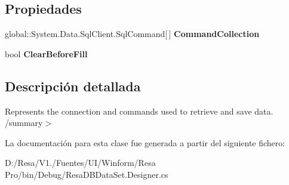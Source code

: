 \subsection*{Propiedades}
\begin{DoxyCompactItemize}
\item 
global\+::\+System.\+Data.\+Sql\+Client.\+Sql\+Command[$\,$] {\bfseries Command\+Collection}\hspace{0.3cm}{\ttfamily  [get]}\label{class_resa___pro_1_1_resa_d_b_data_set_table_adapters_1_1_obtener_eventos_detallados_table_adapter_a82b4ae5c4f653398b4d8f26cc5acdb88}

\item 
bool {\bfseries Clear\+Before\+Fill}\hspace{0.3cm}{\ttfamily  [get, set]}\label{class_resa___pro_1_1_resa_d_b_data_set_table_adapters_1_1_obtener_eventos_detallados_table_adapter_a26e53136c00dde2c8399d6a3c07806e5}

\end{DoxyCompactItemize}


\subsection{Descripción detallada}
Represents the connection and commands used to retrieve and save data. /summary$>$ 

La documentación para esta clase fue generada a partir del siguiente fichero\+:\begin{DoxyCompactItemize}
\item 
D\+:/\+Resa/\+V1./\+Fuentes/\+U\+I/\+Winform/\+Resa Pro/bin/\+Debug/Resa\+D\+B\+Data\+Set.\+Designer.\+cs\end{DoxyCompactItemize}

